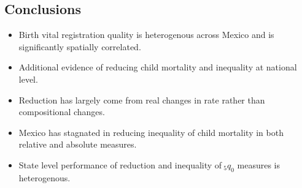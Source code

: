 \documentclass[a0,portrait]{a0poster}
\begin{document}
\begin{multicols}{2}
\section*{Conclusions}

\begin{itemize}
\item Birth vital registration quality is heterogenous across Mexico and is significantly spatially correlated.
\item Additional evidence of reducing child mortality and inequality at national level.
\item Reduction has largely come from real changes in rate rather than compositional changes.
\item Mexico has stagnated in reducing inequality of child mortality in both relative and absolute measures.
\item State level performance of reduction and inequality of$~_{5}q_{0}$ measures is heterogenous.
\end{itemize}

\color{DarkSlateGray} %


%




\end{multicols}
\end{document}
